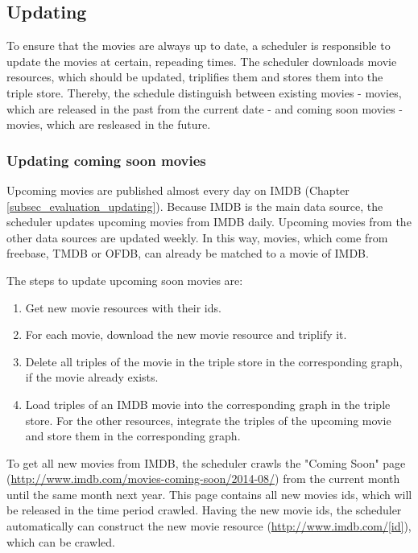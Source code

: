 \subsection{Updating}
\label{subsec_method_updating}

To ensure that the movies are always up to date, a scheduler is responsible to update the movies at certain, repeading times.
The scheduler downloads movie resources, which should be updated, triplifies them and stores them into the triple store.
Thereby, the schedule distinguish between existing movies - movies, which are released in the past from the current date - and coming soon movies - movies, which are resleased in the future.

\subsubsection{Updating coming soon movies}
Upcoming movies are published almost every day on IMDB (Chapter \ref{subsec_evaluation_updating}).
Because IMDB is the main data source, the scheduler updates upcoming movies from IMDB daily.
Upcoming movies from the other data sources are updated weekly.
In this way, movies, which come from freebase, TMDB or OFDB, can already be matched to a movie of IMDB.

The steps to update upcoming soon movies are:
\begin {enumerate}
	\item Get new movie resources with their ids.
	\item For each movie, download the new movie resource and triplify it.
	\item Delete all triples of the movie in the triple store in the corresponding graph, if the movie already exists.
	\item Load triples of an IMDB movie into the corresponding graph in the triple store. For the other resources, integrate the triples of the upcoming movie and store them in the corresponding graph.
\end{enumerate}

To get all new movies from IMDB, the scheduler crawls the "Coming Soon" page (\url{http://www.imdb.com/movies-coming-soon/2014-08/}) from the current month until the same month next year.
This page contains all new movies ids, which will be released in the time period crawled.
Having the new movie ids, the scheduler automatically can construct the new movie resource (\url{http://www.imdb.com/[id]}), which can be crawled.

